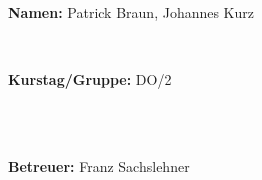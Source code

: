\documentclass[12pt,a4paper]{article}
\begin{document}
\begin{verbatim}
\end{verbatim}
		\begin{flushleft}
			\textbf{\Large{Namen:}} \Large{Patrick Braun, Johannes Kurz}
			\end{flushleft}

\begin{verbatim}


\end{verbatim}
			\begin{flushleft}
			\textbf{\Large{Kurstag/Gruppe:}} \Large{DO/2}
			\end{flushleft}

\begin{verbatim}



\end{verbatim}
			\begin{flushleft}
			\LARGE{\textbf{Betreuer:}}	\Large{ Franz Sachslehner }	
			\end{flushleft}
\end{document}
